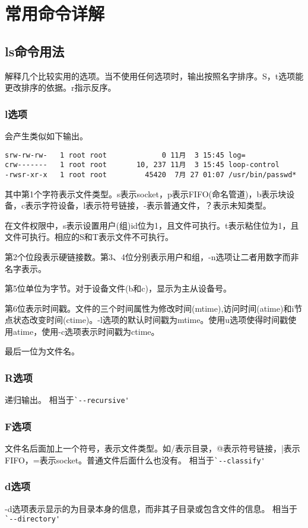 \section{常用命令详解}

\subsection{ls命令用法}
解释几个比较实用的选项。当不使用任何选项时，输出按照名字排序。S，t选项能更改排序的依据。r指示反序。

\subsubsection{l选项}
会产生类似如下输出。
\begin{verbatim}
srw-rw-rw-   1 root root             0 11月  3 15:45 log=
crw-------   1 root root       10, 237 11月  3 15:45 loop-control
-rwsr-xr-x   1 root root         45420  7月 27 01:07 /usr/bin/passwd*
\end{verbatim}
其中第1个字符表示文件类型。s表示socket，p表示FIFO(命名管道)，b表示块设备，c表示字符设备，l表示符号链接，-表示普通文件，？表示未知类型。

在文件权限中，s表示设置用户(组)id位为1，且文件可执行。t表示粘住位为1，且文件可执行。相应的S和T表示文件不可执行。

第2个位段表示硬链接数。第3、4位分别表示用户和组，-n选项让二者用数字而非名字表示。

第5位单位为字节。对于设备文件(b和c)，显示为主从设备号。

第6位表示时间戳。文件的三个时间属性为修改时间(mtime),访问时间(atime)和i节点状态改变时间(ctime)。-l选项的默认时间戳为mtime。使用u选项使得时间戳使用atime，使用-c选项表示时间戳为ctime。

最后一位为文件名。

\subsubsection{R选项}
递归输出。
相当于\verb|`--recursive'|
\subsubsection{F选项}
文件名后面加上一个符号，表示文件类型。如/表示目录，@表示符号链接，|表示FIFO，=表示socket。普通文件后面什么也没有。
相当于\verb|`--classify'|
\subsubsection{d选项}
-d选项表示显示的为目录本身的信息，而非其子目录或包含文件的信息。
相当于\verb|`--directory'|
